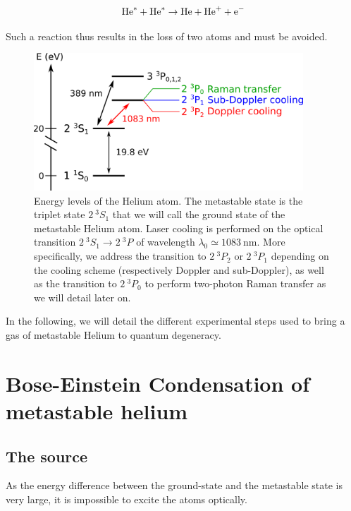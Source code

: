 \begin{equation}
    \mathrm{He}^* + \mathrm{He}^* \rightarrow \mathrm{He} + \mathrm{He}^+ + \mathrm{e}^{-}
\end{equation}

Such a reaction thus results in the loss of two atoms and must be avoided. 

\begin{figure}
    \centering
    \includegraphics[width=0.9\textwidth]{Fig/Chapter3/niveaux.png}
    \caption{Energy levels of the Helium atom. The metastable state is the triplet state $2 \ ^3S_1$ that we will call the ground state of the metastable Helium atom. Laser cooling is performed on the optical transition $2 \ ^3S_1 \rightarrow 2 \ ^3 P$ of wavelength $\lambda_0 \simeq 1083 \ \mathrm{nm}$. More specifically, we address the transition to  $2 \ ^3 P_2$ or $2 \ ^3 P_1$ depending on the cooling scheme (respectively Doppler and sub-Doppler), as well as the transition to  $2 \ ^3 P_0$ to perform two-photon Raman transfer as we will detail later on.}
    \label{fig:niveaux}
\end{figure}

In the following, we will detail the different experimental steps used to bring a gas of metastable Helium to quantum degeneracy.

\section{Bose-Einstein Condensation of metastable helium}

\subsection{The source}

As the energy difference between the ground-state and the metastable state is very large, it is impossible to excite the atoms optically.

